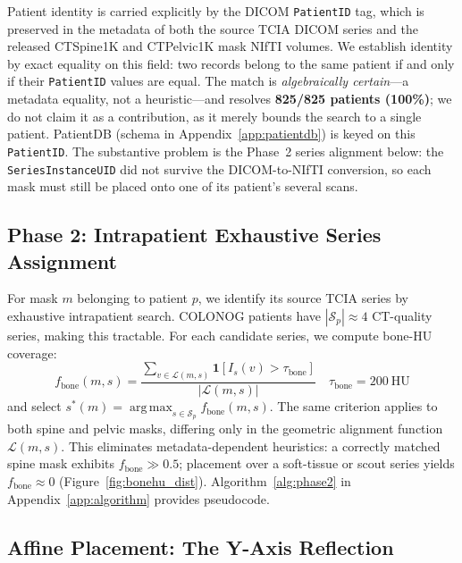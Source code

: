 \documentclass[pmlr]{jmlr}
\DeclareMathOperator*{\argmax}{arg\,max}
\begin{document}
Patient identity is carried explicitly by the DICOM \texttt{PatientID}
tag, which is preserved in the metadata of both the source TCIA DICOM
series and the released CTSpine1K and CTPelvic1K mask NIfTI volumes.
We establish identity by exact equality on this field: two records
belong to the same patient if and only if their \texttt{PatientID}
values are equal. The match is \emph{algebraically certain}---a
metadata equality, not a heuristic---and resolves \textbf{825/825
patients (100\%)}; we do not claim it as a contribution, as it merely
bounds the search to a single patient. PatientDB (schema in
Appendix~\ref{app:patientdb}) is keyed on this \texttt{PatientID}.
The substantive problem is the Phase~2 series alignment below: the
\texttt{SeriesInstanceUID} did not survive the DICOM-to-NIfTI
conversion, so each mask must still be placed onto one of its
patient's several scans.

\subsection{Phase 2: Intrapatient Exhaustive Series Assignment}
\label{sec:phase2}

For mask $m$ belonging to patient $p$, we identify its source TCIA
series by exhaustive intrapatient search.
COLONOG patients have $|\mathcal{S}_p| \approx 4$ CT-quality series,
making this tractable.
For each candidate series, we compute bone-HU coverage:
\begin{equation}
f_\text{bone}(m, s) =
  \frac{\sum_{v \in \mathcal{L}(m,s)}
        \mathbf{1}[I_s(v) > \tau_\text{bone}]}{|\mathcal{L}(m,s)|}
\quad \tau_\text{bone} = 200~\text{HU}
\label{eq:bonehu}
\end{equation}
and select $s^*(m) = \argmax_{s \in \mathcal{S}_p} f_\text{bone}(m,s)$.
The same criterion applies to both spine and pelvic masks, differing
only in the geometric alignment function $\mathcal{L}(m,s)$.
This eliminates metadata-dependent heuristics: a correctly matched
spine mask exhibits $f_\text{bone} \gg 0.5$; placement over a
soft-tissue or scout series yields $f_\text{bone} \approx 0$
(Figure~\ref{fig:bonehu_dist}).
Algorithm~\ref{alg:phase2} in Appendix~\ref{app:algorithm} provides
pseudocode.

\subsection{Affine Placement: The Y-Axis Reflection}
\label{sec:placement}
\end{document}
